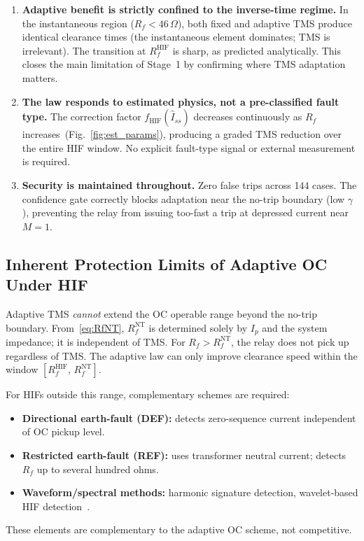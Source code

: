 \documentclass[10pt,journal,twoside]{IEEEtran}
\newcommand{\Rf}{R_{\!f}}
\newcommand{\Iss}{\hat{I}_{ss}}
\newcommand{\fhif}{f_{\mathrm{HIF}}}
\begin{document}
\begin{enumerate}
\item \textbf{Adaptive benefit is strictly confined to the inverse-time regime.}
      In the instantaneous region ($\Rf < 46\,\Omega$), both fixed and
      adaptive TMS produce identical clearance times (the instantaneous element
      dominates; TMS is irrelevant).  The transition at $R_f^{\mathrm{HIF}}$
      is sharp, as predicted analytically.  This closes the main limitation
      of Stage~1 by confirming where TMS adaptation matters.

\item \textbf{The law responds to estimated physics, not a pre-classified
      fault type.}  The correction factor $\fhif(\Iss)$ decreases
      continuously as $\Rf$ increases~(Fig.~\ref{fig:est_params}),
      producing a graded TMS reduction over the entire HIF window.
      No explicit fault-type signal or external measurement is required.

\item \textbf{Security is maintained throughout.}
      Zero false trips across 144 cases.  The confidence gate correctly
      blocks adaptation near the no-trip boundary (low $\gamma$), preventing
      the relay from issuing too-fast a trip at depressed current near $M = 1$.
\end{enumerate}

\subsection{Inherent Protection Limits of Adaptive OC Under HIF}

Adaptive TMS \emph{cannot} extend the OC operable range beyond the no-trip
boundary.  From~\eqref{eq:RfNT}, $R_f^{\mathrm{NT}}$ is determined solely
by $I_p$ and the system impedance; it is independent of TMS.  For
$\Rf > R_f^{\mathrm{NT}}$, the relay does not pick up regardless of TMS.
The adaptive law can only improve clearance speed within the window
$[R_f^{\mathrm{HIF}},\,R_f^{\mathrm{NT}}]$.

For HIFs outside this range, complementary schemes are required:
\begin{itemize}
  \item \textbf{Directional earth-fault (DEF):} detects zero-sequence current
        independent of OC pickup level.
  \item \textbf{Restricted earth-fault (REF):} uses transformer neutral
        current; detects $\Rf$ up to several hundred ohms.
  \item \textbf{Waveform/spectral methods:} harmonic signature detection,
        wavelet-based HIF detection~\cite{Lazkano2000,Zamanan2019}.
\end{itemize}
These elements are complementary to the adaptive OC scheme,
not competitive.
\end{document}
